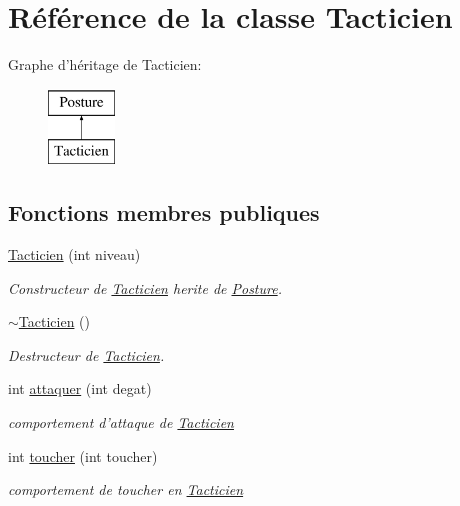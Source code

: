 \hypertarget{classTacticien}{\section{Référence de la classe Tacticien}
\label{classTacticien}
}
Graphe d'héritage de Tacticien\-:\begin{figure}[H]
\begin{center}
\leavevmode
\includegraphics[height=2.000000cm]{classTacticien}
\end{center}
\end{figure}
\subsection*{Fonctions membres publiques}
\begin{DoxyCompactItemize}
\item 
\hyperlink{classTacticien_aafeab917c80abe90da1f97b33a946c5d}{Tacticien} (int niveau)
\begin{DoxyCompactList}\small\item\em Constructeur de \hyperlink{classTacticien}{Tacticien} herite de \hyperlink{classPosture}{Posture}. \end{DoxyCompactList}\item 
\hypertarget{classTacticien_a82d1dcd43e8d66ef380d70e33e0f3030}{\hyperlink{classTacticien_a82d1dcd43e8d66ef380d70e33e0f3030}{$\sim$\-Tacticien} ()}\label{classTacticien_a82d1dcd43e8d66ef380d70e33e0f3030}

\begin{DoxyCompactList}\small\item\em Destructeur de \hyperlink{classTacticien}{Tacticien}. \end{DoxyCompactList}\item 
int \hyperlink{classTacticien_a2634b368edb2603afd2c1a76fdef8890}{attaquer} (int degat)
\begin{DoxyCompactList}\small\item\em comportement d'attaque de \hyperlink{classTacticien}{Tacticien} \end{DoxyCompactList}\item 
int \hyperlink{classTacticien_a1aa0a98a2a29452ec7e61b132d348832}{toucher} (int toucher)
\begin{DoxyCompactList}\small\item\em comportement de toucher en \hyperlink{classTacticien}{Tacticien} \end{DoxyCompactList}\end{DoxyCompactItemize}
